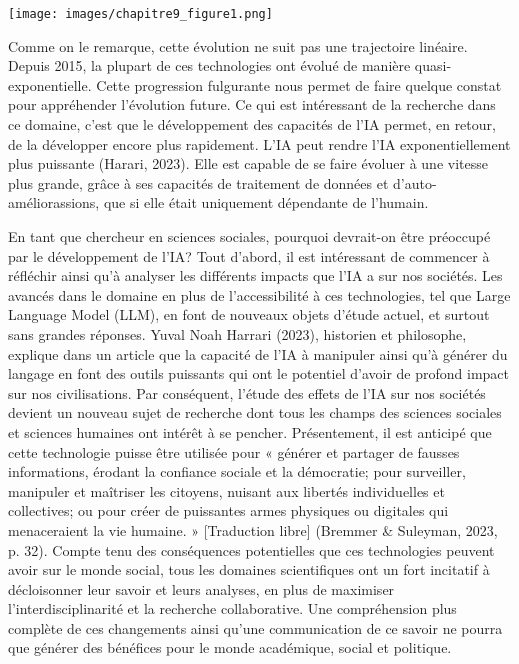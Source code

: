 \documentclass[
  letterpaper,
  DIV=11,
  numbers=noendperiod]{scrreprt}
\begin{document}
\texttt{[image: images/chapitre9\_figure1.png]} \newpage{}

Comme on le remarque, cette évolution ne suit pas une trajectoire
linéaire. Depuis 2015, la plupart de ces technologies ont évolué de
manière quasi-exponentielle. Cette progression fulgurante nous permet de
faire quelque constat pour appréhender l'évolution future. Ce qui est
intéressant de la recherche dans ce domaine, c'est que le développement
des capacités de l'IA permet, en retour, de la développer encore plus
rapidement. L'IA peut rendre l'IA exponentiellement plus puissante
(Harari, 2023). Elle est capable de se faire évoluer à une vitesse plus
grande, grâce à ses capacités de traitement de données et
d'auto-améliorassions, que si elle était uniquement dépendante de
l'humain.

En tant que chercheur en sciences sociales, pourquoi devrait-on être
préoccupé par le développement de l'IA? Tout d'abord, il est intéressant
de commencer à réfléchir ainsi qu'à analyser les différents impacts que
l'IA a sur nos sociétés. Les avancés dans le domaine en plus de
l'accessibilité à ces technologies, tel que Large Language Model (LLM),
en font de nouveaux objets d'étude actuel, et surtout sans grandes
réponses. Yuval Noah Harrari (2023), historien et philosophe, explique
dans un article que la capacité de l'IA à manipuler ainsi qu'à générer
du langage en font des outils puissants qui ont le potentiel d'avoir de
profond impact sur nos civilisations. Par conséquent, l'étude des effets
de l'IA sur nos sociétés devient un nouveau sujet de recherche dont tous
les champs des sciences sociales et sciences humaines ont intérêt à se
pencher. Présentement, il est anticipé que cette technologie puisse être
utilisée pour « générer et partager de fausses informations, érodant la
confiance sociale et la démocratie; pour surveiller, manipuler et
maîtriser les citoyens, nuisant aux libertés individuelles et
collectives; ou pour créer de puissantes armes physiques ou digitales
qui menaceraient la vie humaine. » {[}Traduction libre{]} (Bremmer \&
Suleyman, 2023, p. 32). Compte tenu des conséquences potentielles que
ces technologies peuvent avoir sur le monde social, tous les domaines
scientifiques ont un fort incitatif à décloisonner leur savoir et leurs
analyses, en plus de maximiser l'interdisciplinarité et la recherche
collaborative. Une compréhension plus complète de ces changements ainsi
qu'une communication de ce savoir ne pourra que générer des bénéfices
pour le monde académique, social et politique.
\end{document}

